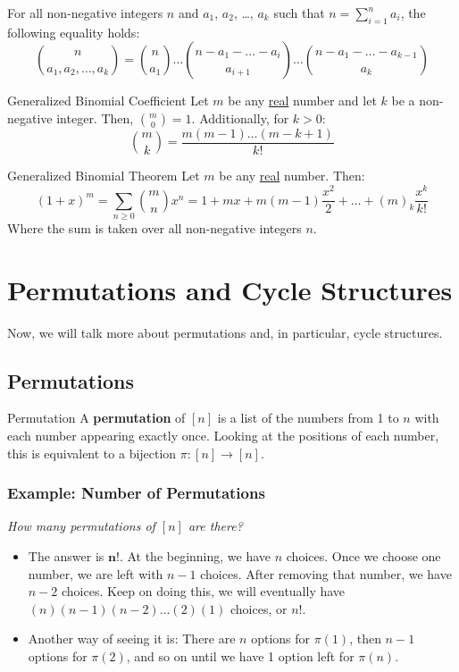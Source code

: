\documentclass[letterpaper]{article}
\begin{document}
\begin{theorem}{}{}
    For all non-negative integers $n$ and $a_1$, $a_2$, \dots, $a_k$ such that $n = \sum_{i = 1}^n a_i$, the following equality holds:
    \[\binom{n}{a_1,a_2,\dots,a_k} = \binom{n}{a_1}\dots\binom{n - a_1 - \dots - a_i}{a_{i + 1}}\dots\binom{n - a_1 - \dots - a_{k - 1}}{a_k}\]
\end{theorem}

\begin{definition}{Generalized Binomial Coefficient}{}
    Let $m$ be any \underline{real} number and let $k$ be a non-negative integer. Then, $\binom{m}{0} = 1$. Additionally, for $k > 0$:
    \[\binom{m}{k} = \frac{m(m - 1)\dots(m - k + 1)}{k!}\]
\end{definition}

\begin{theorem}{Generalized Binomial Theorem}{}
    Let $m$ be any \underline{real} number. Then:
    \[(1 + x)^m = \sum_{n \geq 0} \binom{m}{n} x^n = 1 + mx + m(m - 1)\frac{x^2}{2} + \dots + (m)_k \frac{x^k}{k!}\]
    Where the sum is taken over all non-negative integers $n$.
\end{theorem}


\newpage 
\section{Permutations and Cycle Structures}
Now, we will talk more about permutations and, in particular, cycle structures.

\subsection{Permutations}
\begin{definition}{Permutation}{}
    A \textbf{permutation} of $[n]$ is a list of the numbers from 1 to $n$ with each number appearing exactly once. Looking at the positions of each number, this is equivalent to a bijection $\pi: [n] \to [n]$.  
\end{definition}

\subsubsection{Example: Number of Permutations}
\emph{How many permutations of $[n]$ are there?}
\begin{itemize}
    \item The answer is $\mathbf{n!}$. At the beginning, we have $n$ choices. Once we choose one number, we are left with $n - 1$ choices. After removing that number, we have $n - 2$ choices. Keep on doing this, we will eventually have $(n)(n - 1)(n - 2) \dots (2)(1)$ choices, or $n!$. 
    \item Another way of seeing it is: There are $n$ options for $\pi(1)$, then $n - 1$ options for $\pi(2)$, and so on until we have 1 option left for $\pi(n)$.
\end{itemize}
\end{document}
